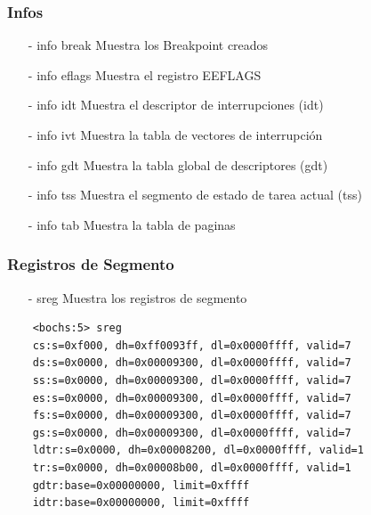 \documentclass[aspectratio=169]{beamer}
\begin{document}
\begin{frame}
\frametitle{Infos}
    \begin{itemize}
    \item[-] info break \hspace{0.5cm}
    \textcolor{verdeuca}{Muestra los Breakpoint creados} %
    \vspace{0.2cm}
    \item[-] info eflags \hspace{0.5cm}
    \textcolor{verdeuca}{Muestra el registro EEFLAGS} %
    \vspace{0.2cm}
    \item[-] info idt \hspace{0.5cm}
    \textcolor{verdeuca}{Muestra el descriptor de interrupciones (idt)} %
    \vspace{0.2cm}
    \item[-] info ivt \hspace{0.5cm}
    \textcolor{verdeuca}{Muestra la tabla de vectores de interrupción} %
    \vspace{0.2cm}
    \item[-] info gdt \hspace{0.5cm}
    \textcolor{verdeuca}{Muestra la tabla global de descriptores (gdt)} %
    \vspace{0.2cm}
    \item[-] info tss \hspace{0.5cm}
    \textcolor{verdeuca}{Muestra el segmento de estado de tarea actual (tss)} %
    \vspace{0.2cm}
    \item[-] info tab \hspace{0.5cm}
    \textcolor{verdeuca}{Muestra la tabla de paginas} %
    \end{itemize}
\end{frame}

\begin{frame}[fragile]
\frametitle{Registros de Segmento}
    \begin{itemize}
        \item[-] sreg \hspace{0.5cm}
    \textcolor{verdeuca}{Muestra los registros de segmento} %
    \end{itemize}
    \small{
    \begin{verbatim}
    <bochs:5> sreg
    cs:s=0xf000, dh=0xff0093ff, dl=0x0000ffff, valid=7
    ds:s=0x0000, dh=0x00009300, dl=0x0000ffff, valid=7
    ss:s=0x0000, dh=0x00009300, dl=0x0000ffff, valid=7
    es:s=0x0000, dh=0x00009300, dl=0x0000ffff, valid=7
    fs:s=0x0000, dh=0x00009300, dl=0x0000ffff, valid=7
    gs:s=0x0000, dh=0x00009300, dl=0x0000ffff, valid=7
    ldtr:s=0x0000, dh=0x00008200, dl=0x0000ffff, valid=1
    tr:s=0x0000, dh=0x00008b00, dl=0x0000ffff, valid=1
    gdtr:base=0x00000000, limit=0xffff
    idtr:base=0x00000000, limit=0xffff
    \end{verbatim}
    }
\end{frame}
\end{document}

